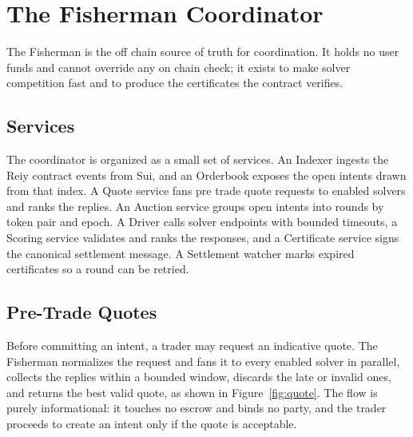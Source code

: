 \documentclass[10pt,sigconf,nonacm]{acmart}
\theoremstyle{reiythm}
\begin{document}
\section{The Fisherman Coordinator}

The Fisherman is the off chain source of truth for coordination. It holds no user
funds and cannot override any on chain check; it exists to make solver competition
fast and to produce the certificates the contract verifies.

\subsection{Services}

The coordinator is organized as a small set of services. An Indexer ingests the
Reiy contract events from Sui, and an Orderbook exposes the open intents drawn
from that index. A Quote service fans pre trade quote requests to enabled solvers
and ranks the replies. An Auction service groups open intents into rounds by token
pair and epoch. A Driver calls solver endpoints with bounded timeouts, a Scoring
service validates and ranks the responses, and a Certificate service signs the
canonical settlement message. A Settlement watcher marks expired certificates so a
round can be retried.

\subsection{Pre-Trade Quotes}

Before committing an intent, a trader may request an indicative quote. The
Fisherman normalizes the request and fans it to every enabled solver in parallel,
collects the replies within a bounded window, discards the late or invalid ones,
and returns the best valid quote, as shown in Figure~\ref{fig:quote}. The flow is
purely informational: it touches no escrow and binds no party, and the trader
proceeds to create an intent only if the quote is acceptable.
\end{document}
